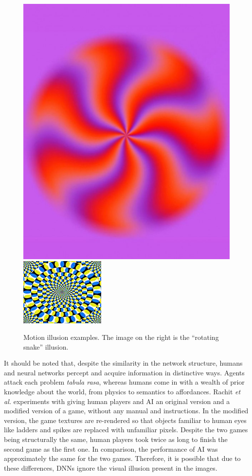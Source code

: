 \documentclass[journal]{IEEEtran}
\begin{document}
  \begin{figure}[t]
    \centering
    \includegraphics[width=0.48\linewidth]{fig/illusion_eg.jpg}
    \includegraphics[width=0.48\linewidth]{fig/rotate-0.png}
    \caption{Motion illusion examples. The image on the right is the ``rotating snake'' illusion.}
    \label{fig:motion_example}
  \end{figure}
  
  It should be noted that, despite the similarity in the network structure, humans and neural networks percept and acquire information in distinctive ways. Agents attack each problem \textit{tabula rasa}, whereas humans come in with a wealth of prior knowledge about the world, from physics to semantics to affordances. Rachit \textit{et al.} \cite{dubey2018investigating} experiments with giving human players and AI an original version and a modified version of a game, without any manual and instructions. In the modified version, the game textures are re-rendered so that objects familiar to human eyes like ladders and spikes are replaced with unfamiliar pixels. Despite the two games being structurally the same, human players took twice as long to finish the second game as the first one. In comparison, the performance of AI was approximately the same for the two games. Therefore, it is possible that due to these differences, DNNs ignore the visual illusion present in the images.
  
\end{document}
